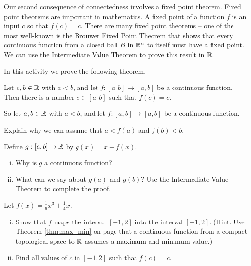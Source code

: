 Our second consequence of connectedness involves a fixed point theorem. Fixed point theorems are important in mathematics. A fixed point of a function $f$ is an input $c$ so that $f(c) = c$. There are many fixed point theorems -- one of the most well-known is the Brouwer Fixed Point Theorem that shows that every continuous function from a closed ball $B$ in $\mathbb{R}^n$ to itself must have a fixed point. We can use the Intermediate Value Theorem to prove this result in $\mathbb{R}$. 

\begin{activity} In this activity we prove the following theorem.

\begin{theorem} Let $a,b \in \mathbb{R}$ with $a < b$, and let $f : [a,b] \to [a,b]$ be a continuous function. Then there is a number $c \in [a,b]$ such that $f(c) = c$. 
\end{theorem}

So let $a,b \in \mathbb{R}$ with $a < b$, and let $f : [a,b] \to [a,b]$ be a continuous function.
\ba
\item Explain why we can assume that $a < f(a)$ and $f(b) < b$. 

\item  Define $g : [a,b] \to \mathbb{R}$ by $g(x) = x-f(x)$.
	\begin{enumerate}[i.]
	\item Why is $g$ a continuous function?
	
	\item What can we say about $g(a)$ and $g(b)$? Use the Intermediate Value Theorem to complete the proof.
	
	\end{enumerate}

\item Let $f(x) = \frac{1}{6}x^3+\frac{1}{4}x$.
	\begin{enumerate}[i.]
	\item Show that $f$ maps the interval $[-1,2]$ into the interval $[-1,2]$. (Hint: Use Theorem \ref{thm:max_min} on page \pageref{thm:max_min} that a continuous function from a compact topological space to $\mathbb{R}$ assumes a maximum and minimum value.)
	
	\item Find all values of $c$ in $[-1,2]$ such that $f(c) = c$. 
	
	\end{enumerate}
	
\ea

\end{activity}

